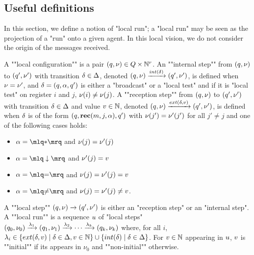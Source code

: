 \subsection{Useful definitions}
\label{sec:decidability-defs}

In this section, we define a notion of "local run"; a "local run" may be seen as the projection of a "run" onto a given agent. In this local vision, we do not consider the origin of the messages received.
	
\AP A ""local configuration"" is a pair $(q, \nu) \in Q \times \mathbb{N}^r$.  
\AP An ""internal step"" from $(q,\nu)$ to $(q',\nu')$ with transition $\delta \in \Delta$, denoted $(q,\localdata) \intstep{\atrans} (q',\localdata')$, is defined when $\nu = \nu'$, and $\delta =(q, \alpha, q')$ is either a "broadcast" or a "local test" and if it is "local test" on register $i$ and $j$, $\nu(i) \ne \nu(j)$.  
\AP A ""reception step"" from $(q,\nu)$ to $(q',\nu')$ with transition $\delta \in \Delta$ and value $v \in \mathbb{N}$, denoted $(q,\localdata) \extbr{\atrans}{\aval} (q',\localdata')$, is defined when $\delta$ is of the form $(q,\textbf{rec}(m, j, \alpha),q')$ with $\nu(j') = \nu'(j')$ for all $j' \neq j$ and one of the following cases holds:
	
	\begin{minipage}[t]{6cm}
		\begin{itemize}
			\item $\anact = \quotemarks{\dummyact}$ 
			and $\nu(j) = \nu'(j)$
			\item $\anact = \quotemarks{\enregact}$ and $\nu'(j) = v$
		\end{itemize}
	\end{minipage}
	\begin{minipage}[t]{6cm}
		\begin{itemize}
			\item $\anact = \quotemarks{\eqtestact}$ and $\nu(j) = \nu'(j)= v$
			\item $\anact = \quotemarks{\diseqtestact}$ and $\nu(j) = \nu'(j) \ne v$.
		\end{itemize}
	\end{minipage}
	

	\AP A ""local step"" $(q,\nu) \xrightarrow{} (q',\nu')$ is either an "reception step" or an "internal step". 
	\AP A ""local run"" is a sequence $u$ of "local steps" $(q_0, \nu_0) \xrightarrow{\lambda_1} (q_1, \nu_1) \xrightarrow{\lambda_2} \cdots \xrightarrow{\lambda_k} (q_k, \nu_k)$ where, for all $i$, $\locallabel_i \in \set{\extlabel{\atrans}{\aval} \mid \atrans \in \transitions, \aval \in \nats} \cup \set{\intlabel{\atrans} \mid \atrans \in \transitions}$. 
	For $v \in \mathbb{N}$ appearing in $u$, $v$ is ""initial"" if its appears in $\nu_0$ and ""non-initial"" otherwise. 

